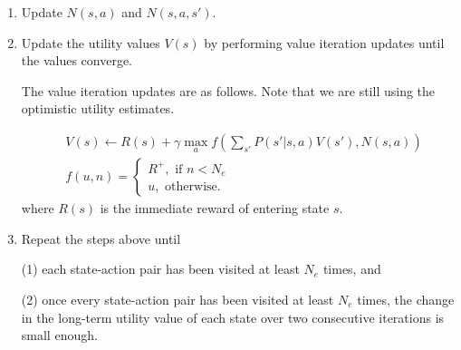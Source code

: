 \documentclass[12pt]{article}
\begin{document}
\begin{enumerate}
\item 
Update $N(s,a)$ and $N(s,a,s')$.

\item 
Update the utility values $V(s)$ by performing value iteration updates until the values converge. 

The value iteration updates are as follows. Note that we are still using the optimistic utility estimates.

\begin{align}
& V(s) \leftarrow R(s) + \gamma \max_{a} f \left( \sum_{s'} P(s'|s,a) V(s'), N(s,a) \right) \\
& f(u,n) = 
\begin{cases}
R^+, \text{ if } n < N_e \\
u, \text{ otherwise.}
\end{cases}
\end{align}
%
where $R(s)$ is the immediate reward of entering state $s$.

\item 
Repeat the steps above until 

(1) each state-action pair has been visited at least $N_e$ times, and 

(2) once every state-action pair has been visited at least $N_e$ times, the change in the long-term utility value of each state over two consecutive iterations is small enough.
\end{enumerate}
 
 
 
\end{document}

